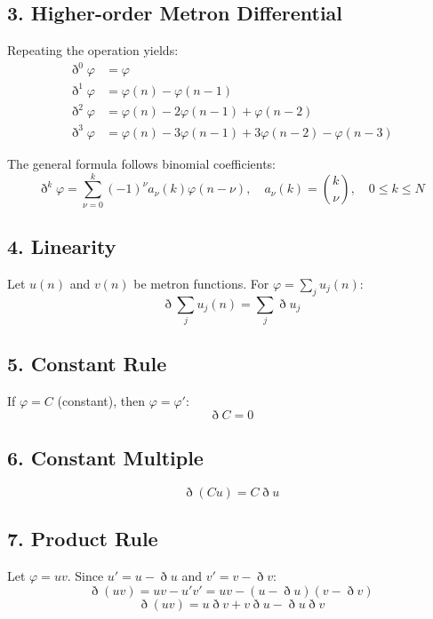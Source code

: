 \documentclass[11pt,a4paper,oneside]{article}
\begin{document}
\subsection{3. Higher-order Metron Differential}

Repeating the operation yields:
\begin{align*}
    \eth^0 \varphi &= \varphi \\
    \eth^1 \varphi &= \varphi(n) - \varphi(n-1) \\
    \eth^2 \varphi &= \varphi(n) - 2\varphi(n-1) + \varphi(n-2) \\
    \eth^3 \varphi &= \varphi(n) - 3\varphi(n-1) + 3\varphi(n-2) - \varphi(n-3)
\end{align*}

The general formula follows binomial coefficients:
\begin{equation}
    \eth^k \varphi = \sum_{\nu=0}^{k} (-1)^\nu a_\nu(k) \varphi(n-\nu), \quad a_\nu(k) = \binom{k}{\nu}, \quad 0 \le k \le N \tag{M3}
\end{equation}

\subsection{4. Linearity}
Let $u(n)$ and $v(n)$ be metron functions. For $\varphi = \sum_j u_j(n)$:
\begin{equation}
    \eth \sum_j u_j(n) = \sum_j \eth u_j
\end{equation}

\subsection{5. Constant Rule}
If $\varphi = C$ (constant), then $\varphi = \varphi'$:
\begin{equation}
    \eth C = 0
\end{equation}

\subsection{6. Constant Multiple}
\begin{equation}
    \eth (Cu) = C \eth u
\end{equation}

\subsection{7. Product Rule}
Let $\varphi = uv$. Since $u' = u - \eth u$ and $v' = v - \eth v$:
\begin{equation*}
    \eth(uv) = uv - u'v' = uv - (u - \eth u)(v - \eth v)
\end{equation*}
\begin{equation}
    \eth (uv) = u \eth v + v \eth u - \eth u \eth v
\end{equation}
\end{document}
